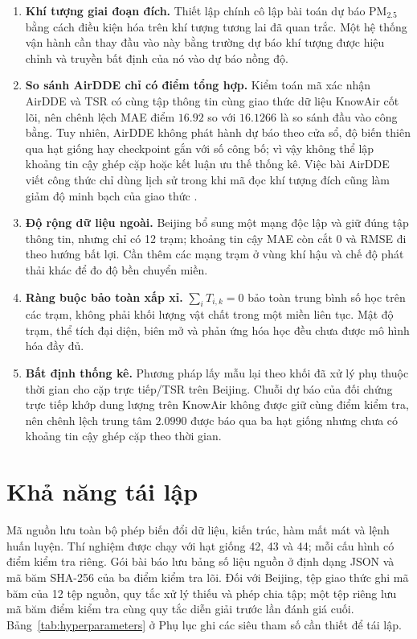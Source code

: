 \documentclass[10pt,a4paper]{article}
\newcommand{\pmfine}{PM$_{2.5}$}
\newcommand{\modelname}{TSR}
\begin{document}
\begin{enumerate}
  \item \textbf{Khí tượng giai đoạn đích.} Thiết lập chính cô lập bài toán dự báo \pmfine{} bằng cách điều kiện hóa trên khí tượng tương lai đã quan trắc. Một hệ thống vận hành cần thay đầu vào này bằng trường dự báo khí tượng được hiệu chỉnh và truyền bất định của nó vào dự báo nồng độ.
  \item \textbf{So sánh AirDDE chỉ có điểm tổng hợp.} Kiểm toán mã xác nhận AirDDE và \modelname{} có cùng tập thông tin cùng giao thức dữ liệu KnowAir cốt lõi, nên chênh lệch MAE điểm $16.92$ so với $16.1266$ là so sánh đầu vào công bằng. Tuy nhiên, AirDDE không phát hành dự báo theo cửa sổ, độ biến thiên qua hạt giống hay checkpoint gắn với số công bố; vì vậy không thể lập khoảng tin cậy ghép cặp hoặc kết luận ưu thế thống kê. Việc bài AirDDE viết công thức chỉ dùng lịch sử trong khi mã đọc khí tượng đích cũng làm giảm độ minh bạch của giao thức \citep{wu2026airdde}.
  \item \textbf{Độ rộng dữ liệu ngoài.} Beijing bổ sung một mạng độc lập và giữ đúng tập thông tin, nhưng chỉ có 12 trạm; khoảng tin cậy MAE còn cắt 0 và RMSE đi theo hướng bất lợi. Cần thêm các mạng trạm ở vùng khí hậu và chế độ phát thải khác để đo độ bền chuyển miền.
  \item \textbf{Ràng buộc bảo toàn xấp xỉ.} $\sum_iT_{i,k}=0$ bảo toàn trung bình số học trên các trạm, không phải khối lượng vật chất trong một miền liên tục. Mật độ trạm, thể tích đại diện, biên mở và phản ứng hóa học đều chưa được mô hình hóa đầy đủ.
  \item \textbf{Bất định thống kê.} Phương pháp lấy mẫu lại theo khối đã xử lý phụ thuộc thời gian cho cặp trực tiếp/\modelname{} trên Beijing. Chuỗi dự báo của đối chứng trực tiếp khớp dung lượng trên KnowAir không được giữ cùng điểm kiểm tra, nên chênh lệch trung tâm $2.0990$ được báo qua ba hạt giống nhưng chưa có khoảng tin cậy ghép cặp theo thời gian.
\end{enumerate}

\section{Khả năng tái lập}

Mã nguồn lưu toàn bộ phép biến đổi dữ liệu, kiến trúc, hàm mất mát và lệnh huấn luyện. Thí nghiệm được chạy với hạt giống 42, 43 và 44; mỗi cấu hình có điểm kiểm tra riêng. Gói bài báo lưu bảng số liệu nguồn ở định dạng JSON và mã băm SHA-256 của ba điểm kiểm tra lõi. Đối với Beijing, tệp giao thức ghi mã băm của 12 tệp nguồn, quy tắc xử lý thiếu và phép chia tập; một tệp riêng lưu mã băm điểm kiểm tra cùng quy tắc diễn giải trước lần đánh giá cuối. Bảng~\ref{tab:hyperparameters} ở Phụ lục ghi các siêu tham số cần thiết để tái lập.
\end{document}
